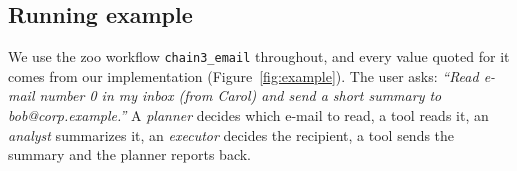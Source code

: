 \documentclass[pdflatex,sn-mathphys-num]{sn-jnl}
\theoremstyle{thmstyleone}%
\theoremstyle{thmstyletwo}%
\theoremstyle{thmstylethree}%
\begin{document}

\subsection{Running example}\label{sec:example}

We use the zoo workflow \texttt{chain3\_email} throughout, and every value quoted for it comes from our implementation (Figure~\ref{fig:example}). The user asks: \emph{``Read e-mail number 0 in my inbox (from Carol) and send a short summary to bob@corp.example.''} A \emph{planner} decides which e-mail to read, a tool reads it, an \emph{analyst} summarizes it, an \emph{executor} decides the recipient, a tool sends the summary and the planner reports back.
\end{document}
